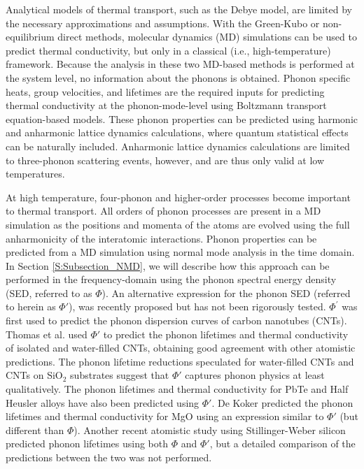 \documentclass[aps,prb,preprint,superscriptaddress,amsmath,amssymb,floatfix]{revtex4}
\begin{document}
Analytical models of thermal transport, such as the Debye model, are limited by
the necessary approximations and assumptions.\cite{callaway1959,holland1963,mcgaughey2011a} With the Green-Kubo or
non-equilibrium direct methods, molecular dynamics (MD) simulations can be used to predict thermal
conductivity, but only in a classical (i.e., high-temperature) framework.\cite{ladd1986,mcgaughey2004c,landry2008,schelling2002,sellan2010a,esfarjani2011,turney2009a} Because the analysis in these two MD-based methods is performed at the system level, no information about the phonons is obtained. Phonon specific heats, group velocities, and lifetimes are the required inputs for predicting thermal conductivity at the phonon-mode-level using  Boltzmann transport equation-based models.\cite{ladd1986,mcgaughey2004c,mcgaughey2011a,sellan2010b,esfarjani2011,turney2009a,He2011}
These phonon properties can be predicted using harmonic and anharmonic lattice dynamics
calculations,\cite{maradudin1962,wallace1972,ladd1986,dove1993,turney2009a,turney2009b} where quantum statistical effects can be naturally included. Anharmonic lattice dynamics calculations are limited to three-phonon scattering events, however, and are thus only valid at low temperatures.\cite{turney2009a,esfarjani2011,wallace1972,srivastava1990}

At high temperature, four-phonon and higher-order processes become important to thermal transport.\cite{wallace1972,srivastava1990,turney2009a,esfarjani2011} All orders of phonon processes are present in a MD simulation as the positions and momenta of the atoms are evolved using the full anharmonicity of the interatomic interactions.\cite{mcgaughey2004c,esfarjani2011} Phonon properties can be predicted from a MD simulation using normal mode analysis in the time domain.\cite{ladd1986,mcgaughey2004c,henry2008,turney2009a,goicochea2010,He2011} In Section \ref{S:Subsection_NMD}, we will describe how this approach can be performed in the frequency-domain using the phonon spectral energy density (SED, referred to as $\Phi$). An alternative expression for the phonon SED (referred to herein as $\Phi'$), was recently proposed but has not been rigorously tested.\cite{maruyama2003,shiomi2006,thomas2010c} $\Phi^{'}$ was first used to predict the phonon dispersion curves of carbon nanotubes (CNTs).\cite{maruyama2003} Thomas et al. used $\Phi'$ to predict the phonon lifetimes and thermal conductivity of isolated and water-filled CNTs, obtaining good agreement with other atomistic predictions.\cite{thomas2010c} The phonon lifetime reductions speculated for water-filled CNTs\cite{thomas2010c} and CNTs on SiO$_2$ substrates\cite{shiomi2011b} suggest that $\Phi'$ captures phonon physics at least qualitatively. The phonon lifetimes and thermal conductivity for PbTe\cite{qiu2011} and Half Heusler alloys\cite{shiomi2011a} have also been predicted using $\Phi'$. De Koker predicted the phonon lifetimes and thermal conductivity for MgO using an expression similar to $\Phi'$ (but different than $\Phi$).\cite{dekoker2009} Another recent atomistic study using Stillinger-Weber silicon predicted phonon lifetimes using both $\Phi$ and $\Phi'$, but a detailed comparison of the predictions between the two was not performed.\cite{Hori2012}
\end{document}
